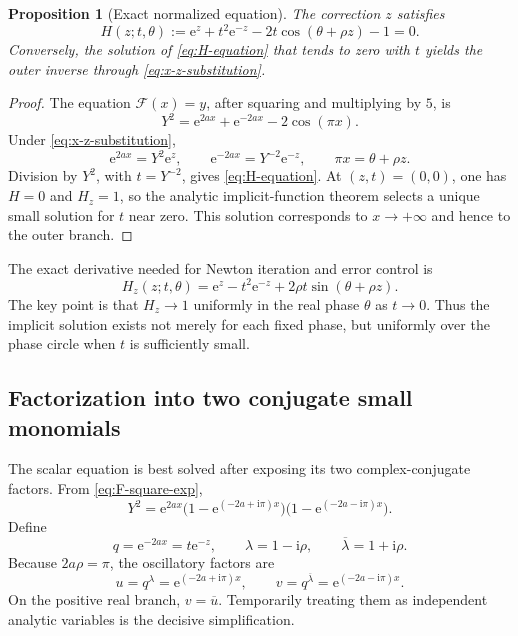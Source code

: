 \documentclass[11pt,oneside]{article}
\theoremstyle{plain}
\newtheorem{proposition}[theorem]{Proposition}
\theoremstyle{definition}
\theoremstyle{remark}
\newcommand{\e}{\mathrm{e}}
\newcommand{\ii}{\mathrm{i}}
\newcommand{\Fcal}{\mathcal{F}}
\begin{document}
\begin{proposition}[Exact normalized equation]
\label{prop:normalized-equation}
The correction \(z\) satisfies
\begin{equation}
 \boxed{
 H(z;t,\theta):=
 \e^z+t^2\e^{-z}-2t\cos(\theta+\rho z)-1=0.}
 \label{eq:H-equation}
\end{equation}
Conversely, the solution of \eqref{eq:H-equation} that tends to zero with
\(t\) yields the outer inverse through \eqref{eq:x-z-substitution}.
\end{proposition}

\begin{proof}
The equation \(\Fcal(x)=y\), after squaring and multiplying by \(5\), is
\[
 Y^2=\e^{2ax}+\e^{-2ax}-2\cos(\pi x).
\]
Under \eqref{eq:x-z-substitution},
\[
 \e^{2ax}=Y^2\e^z,
 \qquad
 \e^{-2ax}=Y^{-2}\e^{-z},
 \qquad
 \pi x=\theta+\rho z.
\]
Division by \(Y^2\), with \(t=Y^{-2}\), gives
\eqref{eq:H-equation}.  At \((z,t)=(0,0)\), one has \(H=0\) and
\(H_z=1\), so the analytic implicit-function theorem selects a unique small
solution for \(t\) near zero.  This solution corresponds to \(x\to+\infty\)
and hence to the outer branch.
\end{proof}

The exact derivative needed for Newton iteration and error control is
\begin{equation}
 H_z(z;t,\theta)=
 \e^z-t^2\e^{-z}+2\rho t\sin(\theta+\rho z).
 \label{eq:Hz}
\end{equation}
The key point is that \(H_z\to1\) uniformly in the real phase \(\theta\) as
\(t\to0\).  Thus the implicit solution exists not merely for each fixed phase,
but uniformly over the phase circle when \(t\) is sufficiently small.

\subsection{Factorization into two conjugate small monomials}

The scalar equation is best solved after exposing its two complex-conjugate
factors.  From \eqref{eq:F-square-exp},
\begin{equation}
 Y^2=\e^{2ax}
 \bigl(1-\e^{(-2a+\ii\pi)x}\bigr)
 \bigl(1-\e^{(-2a-\ii\pi)x}\bigr).
 \label{eq:factorized-inverse-equation}
\end{equation}
Define
\begin{equation}
 q=\e^{-2ax}=t\e^{-z},
 \qquad
 \lambda=1-\ii\rho,
 \qquad
 \overline\lambda=1+\ii\rho.
 \label{eq:q-lambda}
\end{equation}
Because \(2a\rho=\pi\), the oscillatory factors are
\begin{equation}
 u=q^\lambda=\e^{(-2a+\ii\pi)x},
 \qquad
 v=q^{\overline\lambda}=\e^{(-2a-\ii\pi)x}.
 \label{eq:u-v-physical}
\end{equation}
On the positive real branch, \(v=\overline u\).  Temporarily treating them as
independent analytic variables is the decisive simplification.
\end{document}
